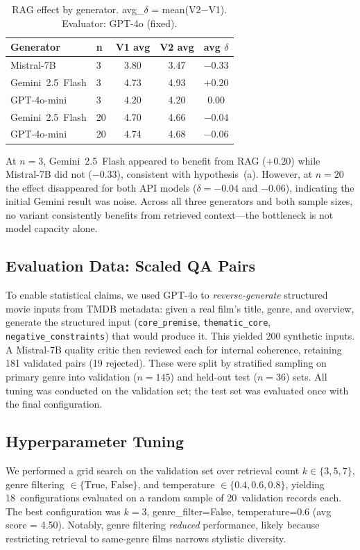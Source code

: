 \documentclass[10pt,twocolumn]{article}
\begin{document}
\begin{table}[h]
\centering
\small
\caption{RAG effect by generator. avg\_$\delta$ = mean(V2$-$V1). Evaluator: GPT-4o (fixed).}
\label{tab:generator}
\begin{tabular}{llccc}
\toprule
\textbf{Generator} & \textbf{n} & \textbf{V1 avg} & \textbf{V2 avg} & \textbf{avg $\delta$} \\
\midrule
Mistral-7B & 3 & 3.80 & 3.47 & $-0.33$ \\
Gemini~2.5~Flash & 3 & 4.73 & 4.93 & $+0.20$ \\
GPT-4o-mini & 3 & 4.20 & 4.20 & $0.00$ \\
\midrule
Gemini~2.5~Flash & 20 & 4.70 & 4.66 & $-0.04$ \\
GPT-4o-mini & 20 & 4.74 & 4.68 & $-0.06$ \\
\bottomrule
\end{tabular}
\end{table}

At $n{=}3$, Gemini~2.5~Flash appeared to benefit from RAG ($+0.20$) while Mistral-7B did not ($-0.33$), consistent with hypothesis~(a). However, at $n{=}20$ the effect disappeared for both API models ($\delta{=}-0.04$ and $-0.06$), indicating the initial Gemini result was noise. Across all three generators and both sample sizes, no variant consistently benefits from retrieved context---the bottleneck is not model capacity alone.

\subsection{Evaluation Data: Scaled QA Pairs}
\label{sec:scaled}
To enable statistical claims, we used GPT-4o to \textit{reverse-generate} structured movie inputs from TMDB metadata: given a real film's title, genre, and overview, generate the structured input (\texttt{core\_premise}, \texttt{thematic\_core}, \texttt{negative\_constraints}) that would produce it. This yielded 200 synthetic inputs. A Mistral-7B quality critic then reviewed each for internal coherence, retaining 181 validated pairs (19 rejected). These were split by stratified sampling on primary genre into validation ($n{=}145$) and held-out test ($n{=}36$) sets. All tuning was conducted on the validation set; the test set was evaluated once with the final configuration.

\subsection{Hyperparameter Tuning}
\label{sec:tuning}
We performed a grid search on the validation set over retrieval count $k \in \{3,5,7\}$, genre filtering $\in \{\text{True, False}\}$, and temperature $\in \{0.4, 0.6, 0.8\}$, yielding 18~configurations evaluated on a random sample of 20~validation records each. The best configuration was $k{=}3$, genre\_filter=False, temperature=0.6 (avg score = 4.50). Notably, genre filtering \textit{reduced} performance, likely because restricting retrieval to same-genre films narrows stylistic diversity.
\end{document}
